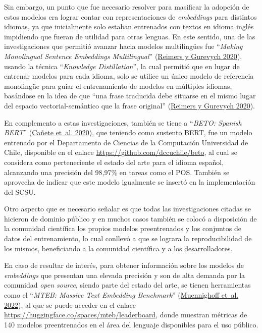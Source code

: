 \documentclass[
  12pt,
  openany]{book}
\begin{document}
Sin embargo, un punto que fue necesario resolver para masificar la adopción de estos modelos era lograr contar con representaciones de \emph{embeddings} para distintos idiomas, ya que inicialmente solo estaban entrenados con textos en idioma inglés impidiendo que fueran de utilidad para otras lenguas. En este sentido, una de las investigaciones que permitió avanzar hacia modelos multilingües fue ``\emph{Making Monolingual Sentence Embeddings Multilingual}'' (\protect\hyperlink{ref-reimers2020}{Reimers y Gurevych 2020}), usando la técnica ``\emph{Knowledge Distillation}'', la cual permitió que en lugar de entrenar modelos para cada idioma, solo se utilice un único modelo de referencia monolingüe para guiar el entrenamiento de modelos en múltiples idiomas, basándose en la idea de que ``una frase traducida debe situarse en el mismo lugar del espacio vectorial-semántico que la frase original'' (\protect\hyperlink{ref-reimers2020}{Reimers y Gurevych 2020}).

En complemento a estas investigaciones, también se tiene a ``\emph{BETO: Spanish BERT}'' (\protect\hyperlink{ref-CaneteCFP2020}{Cañete et~al. 2020}), que teniendo como sustento BERT, fue un modelo entrenado por el Departamento de Ciencias de la Computación Universidad de Chile, disponible en el enlace \url{https://github.com/dccuchile/beto}, al cual se considera como perteneciente el estado del arte para el idioma español, alcanzando una precisión del 98,97\% en tareas como el POS. También se aprovecha de indicar que este modelo igualmente se insertó en la implementación del SCSU.

Otro aspecto que es necesario señalar es que todas las investigaciones citadas se hicieron de dominio público y en muchos casos también se colocó a disposición de la comunidad científica los propios modelos preentrenados y los conjuntos de datos del entrenamiento, lo cual conllevó a que se lograra la reproducibilidad de los mismos, beneficiando a la comunidad científica y a los desarrolladores.

En caso de resultar de interés, para obtener información sobre los modelos de \emph{embeddings} que presentan una elevada precisión y son de alta demanda por la comunidad \emph{open source}, siendo parte del estado del arte, se tienen herramientas como el ``\emph{MTEB: Massive Text Embedding Benchmark}'' (\protect\hyperlink{ref-muennighoff2022}{Muennighoff et~al. 2022}), al que se puede acceder en el enlace \url{https://huggingface.co/spaces/mteb/leaderboard}, donde muestran métricas de 140 modelos preentrenados en el área del lenguaje disponibles para el uso público.
\end{document}
